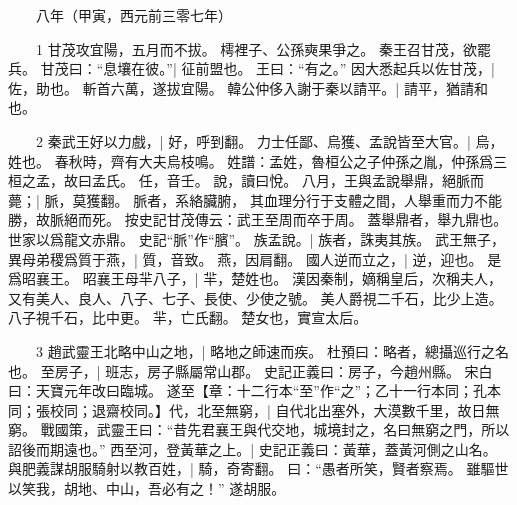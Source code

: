 　　八年（甲寅，西元前三零七年）

　　1 甘茂攻宜陽，五月而不拔。
	樗裡子、公孫奭果爭之。
	秦王召甘茂，欲罷兵。
	甘茂曰：“息壤在彼。”|{
	征前盟也。
}
王曰：“有之。”
因大悉起兵以佐甘茂，|{
	佐，助也。
}
斬首六萬，遂拔宜陽。
	韓公仲侈入謝于秦以請平。|{
	請平，猶請和也。
}

　　2 秦武王好以力戲，|{
	好，呼到翻。
}
力士任鄙、烏獲、孟說皆至大官。|{
	烏，姓也。
	春秋時，齊有大夫烏枝鳴。
	姓譜：孟姓，魯桓公之子仲孫之胤，仲孫爲三桓之孟，故曰孟氏。
	任，音壬。
	說，讀曰悅。
}
八月，王與孟說舉鼎，絕脈而薨；|{
	脈，莫獲翻。
	脈者，系絡臟腑， 其血理分行于支體之間，人舉重而力不能勝，故脈絕而死。
	按史記甘茂傳云：武王至周而卒于周。
	蓋舉鼎者，舉九鼎也。
	世家以爲龍文赤鼎。
	史記“脈”作“臏”。
}
族孟說。|{
	族者，誅夷其族。
}
武王無子，異母弟稷爲質于燕，|{
	質，音致。
	燕，因肩翻。
}
國人逆而立之，|{
	逆，迎也。
}
是爲昭襄王。
	昭襄王母羋八子，|{
	羋，楚姓也。
	漢因秦制，嫡稱皇后，次稱夫人，又有美人、良人、八子、七子、長使、少使之號。
	美人爵視二千石，比少上造。
	八子視千石，比中更。
	羋，亡氏翻。
}
楚女也，實宣太后。


　　3 趙武靈王北略中山之地，|{
	略地之師速而疾。
	杜預曰：略者，總攝巡行之名也。
}
至房子，|{
	班志，房子縣屬常山郡。
	史記正義曰：房子，今趙州縣。
	宋白曰：天寶元年改曰臨城。
}
遂至【章：十二行本“至”作“之”；乙十一行本同；孔本同；張校同；退齋校同。】代，北至無窮，|{
	自代北出塞外，大漠數千里，故日無窮。
	戰國策，武靈王曰：“昔先君襄王與代交地，城境封之，名曰無窮之門，所以詔後而期遠也。”
	}
西至河，登黃華之上。|{
	史記正義曰：黃華，蓋黃河側之山名。
}
與肥義謀胡服騎射以教百姓，|{
	騎，奇寄翻。
}
曰：“愚者所笑，賢者察焉。
	雖驅世以笑我，胡地、中山，吾必有之！”
	遂胡服。


